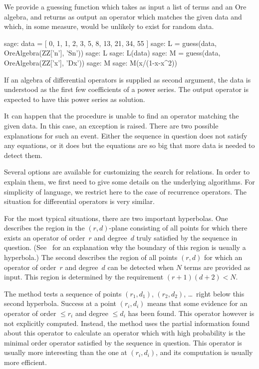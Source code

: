 \documentclass[11pt]{amsart}
\begin{document}
We provide a guessing function which takes as input a list of terms and an Ore
algebra, and returns as output an operator which matches the given data and
which, in some measure, would be unlikely to exist for random data.

\begin{sageexample}
  sage: data = [ 0, 1, 1, 2, 3, 5, 8, 13, 21, 34, 55 ]
  sage: L = guess(data, OreAlgebra(ZZ['n'], 'Sn'))
  sage: L
  sage: L(data)
  sage: M = guess(data, OreAlgebra(ZZ['x'], 'Dx'))
  sage: M
  sage: M(x/(1-x-x^2))
\end{sageexample}

If an algebra of differential operators is supplied as second argument, the data
is understood as the first few coefficients of a power series. The output
operator is expected to have this power series as solution.

It can happen that the procedure is unable to find an operator matching the 
given data. In this case, an exception is raised. There are two possible 
explanations for such an event. Either the sequence in question does not 
satisfy any equations, or it does but the equations are so big that more
data is needed to detect them. 

Several options are available for customizing the search for relations.  In
order to explain them, we first need to give some details on the underlying
algorithms. For simplicity of language, we restrict here to the case of
recurrence operators. The situation for differential operators is very similar.

For the most typical situations, there are two important hyperbolas. One
describes the region in the $(r,d)$-plane consisting of all points for which
there exists an operator of order~$r$ and degree~$d$ truly satisfied by the
sequence in question. (See~\cite{jaroschek13a} for an explanation why the
boundary of this region is usually a hyperbola.) The second describes the region
of all points $(r,d)$ for which an operator of order~$r$ and degree~$d$ can be
detected when $N$ terms are provided as input. This region is determined by the
requirement $(r+1)(d+2)<N$.

The method tests a sequence of points $(r_1,d_1)$, $(r_2,d_2)$, \dots\ right
below this second hyperbola. Success at a point $(r_i,d_i)$ means that some
evidence for an operator of order $\leq r_i$ and degree $\leq d_i$ has been found. 
This operator however is not explicitly computed. Instead, the method uses the
partial information found about this operator to calculate an operator which with 
high probability is the minimal order operator satisfied by the sequence in question. 
This operator is usually more interesting than the one at $(r_i,d_i)$, and its 
computation is usually more efficient. 
\end{document}
